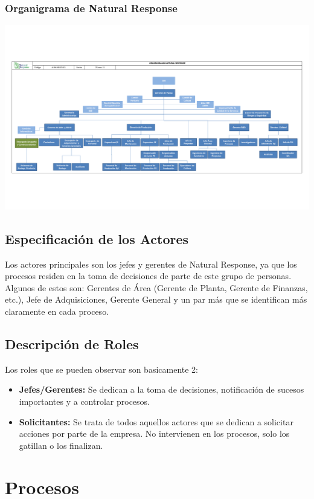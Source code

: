 \documentclass[12pt,letterpaper]{article}
\begin{document}
\subsubsection{Organigrama de Natural Response}
\includegraphics[angle=90,page=1,height=\textheight - 40px]{organigrama_nr.pdf}

\subsection{Especificación de los Actores}
Los actores principales son los jefes y gerentes de Natural Response, ya que los procesos residen en la toma de decisiones de parte de este grupo de personas. Algunos de estos son: Gerentes de Área (Gerente de Planta, Gerente de Finanzas, etc.), Jefe de Adquisiciones, Gerente General y un par más que se identifican más claramente en cada proceso.

\subsection{Descripción de Roles}
Los roles que se pueden observar son basicamente 2:
\begin{itemize}
\item \textbf{Jefes/Gerentes:} Se dedican a la toma de decisiones, notificación de sucesos importantes y a controlar procesos.
\item \textbf{Solicitantes:} Se trata de todos aquellos actores que se dedican a solicitar acciones por parte de la empresa. No intervienen en los procesos, solo los gatillan o los finalizan.
\end{itemize}

\section{Procesos}
\end{document}
